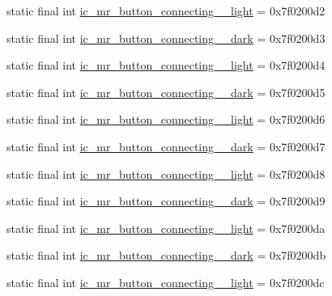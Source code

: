 \begin{CompactItemize}
\item 
static final int \hyperlink{classandroid_1_1support_1_1graphics_1_1drawable_1_1_r_1_1drawable_a4c7abc6773ec96c39c58a530991fb7a}{ic\_\-mr\_\-button\_\-connecting\_\_\-light} = 0x7f0200d2
\item 
static final int \hyperlink{classandroid_1_1support_1_1graphics_1_1drawable_1_1_r_1_1drawable_932e39116e7cd41323574c5f01b7ef15}{ic\_\-mr\_\-button\_\-connecting\_\_\-dark} = 0x7f0200d3
\item 
static final int \hyperlink{classandroid_1_1support_1_1graphics_1_1drawable_1_1_r_1_1drawable_af018db16a0fde980f0be5a248ab8c2a}{ic\_\-mr\_\-button\_\-connecting\_\_\-light} = 0x7f0200d4
\item 
static final int \hyperlink{classandroid_1_1support_1_1graphics_1_1drawable_1_1_r_1_1drawable_746c75093059941c88b0c2dbcaf0ca74}{ic\_\-mr\_\-button\_\-connecting\_\_\-dark} = 0x7f0200d5
\item 
static final int \hyperlink{classandroid_1_1support_1_1graphics_1_1drawable_1_1_r_1_1drawable_f768df319118d1467f059cf941cd2d67}{ic\_\-mr\_\-button\_\-connecting\_\_\-light} = 0x7f0200d6
\item 
static final int \hyperlink{classandroid_1_1support_1_1graphics_1_1drawable_1_1_r_1_1drawable_71e135cd84a85e76dde238dd6c264eba}{ic\_\-mr\_\-button\_\-connecting\_\_\-dark} = 0x7f0200d7
\item 
static final int \hyperlink{classandroid_1_1support_1_1graphics_1_1drawable_1_1_r_1_1drawable_15617058555b4aab4d3d02e5301ace24}{ic\_\-mr\_\-button\_\-connecting\_\_\-light} = 0x7f0200d8
\item 
static final int \hyperlink{classandroid_1_1support_1_1graphics_1_1drawable_1_1_r_1_1drawable_0fe9800e240a5ee2c29488196cdb49e1}{ic\_\-mr\_\-button\_\-connecting\_\_\-dark} = 0x7f0200d9
\item 
static final int \hyperlink{classandroid_1_1support_1_1graphics_1_1drawable_1_1_r_1_1drawable_60895e2e5e208ca14da89aa5f83032b7}{ic\_\-mr\_\-button\_\-connecting\_\_\-light} = 0x7f0200da
\item 
static final int \hyperlink{classandroid_1_1support_1_1graphics_1_1drawable_1_1_r_1_1drawable_3bebf64434af82a7bfdf1e6ea2bf93ea}{ic\_\-mr\_\-button\_\-connecting\_\_\-dark} = 0x7f0200db
\item 
static final int \hyperlink{classandroid_1_1support_1_1graphics_1_1drawable_1_1_r_1_1drawable_68b153c39eadc2787f93ad31b423a60c}{ic\_\-mr\_\-button\_\-connecting\_\_\-light} = 0x7f0200dc

\end{CompactItemize}

